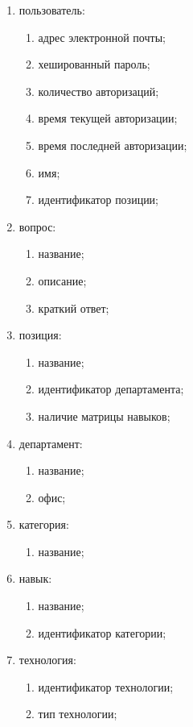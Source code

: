 \begin{enumerate}
  \item пользователь:
    \begin{enumerate}
      \item адрес электронной почты;
      \item хешированный пароль;
      \item количество авторизаций;
      \item время текущей авторизации;
      \item время последней авторизации;
      \item имя;
      \item идентификатор позиции;
    \end{enumerate}
  \item вопрос:
    \begin{enumerate}
      \item название;
      \item описание;
      \item краткий ответ;
    \end{enumerate}
  \item позиция:
    \begin{enumerate}
      \item название;
      \item идентификатор департамента;
      \item наличие матрицы навыков;
    \end{enumerate}
  \item департамент:
    \begin{enumerate}
      \item название;
      \item офис;
    \end{enumerate}
  \item категория:
    \begin{enumerate}
      \item название;
    \end{enumerate}
  \item навык:
    \begin{enumerate}
      \item название;
      \item идентификатор категории;
    \end{enumerate}
  \item технология:
    \begin{enumerate}
      \item идентификатор технологии;
      \item тип технологии;

\end{enumerate}
\end{enumerate}
